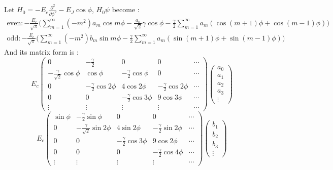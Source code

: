 \documentclass{article}
\begin{document}
Let $H_0 = -E_c \frac{\partial^2}{\partial \phi^2} - E_J \cos\phi$, $H_0 \psi$ become :
\begin{align}
    \text{even} : -\frac{E_c}{\sqrt{\pi}}\bigg(\sum^\infty_{m=1} (-m^2)a_m\cos m \phi - \frac{a_0}{\sqrt{2}}\gamma\cos\phi - \frac{\gamma}{2}\sum^\infty_{m=1}a_m(\cos(m+1)\phi + \cos(m-1)\phi)\bigg) \\
    \text{odd} : -\frac{E_c}{\sqrt{\pi}}\bigg(\sum^\infty_{m=1} (-m^2)b_m\sin m \phi - \frac{\gamma}{2}\sum^\infty_{m=1}a_m(\sin(m+1)\phi + \sin(m-1)\phi)\bigg)
\end{align}
And its matrix form is :
\begin{equation}
    E_c
    \begin{pmatrix}
      0 & -\frac{\gamma}{2} & 0 &  0 &\cdots \\
      -\frac{\gamma}{\sqrt{2}}\cos \phi & \cos \phi & -\frac{\gamma}{2} \cos \phi & 0 & \cdots \\
      0 & -\frac{\gamma}{2} \cos 2\phi & 4\cos 2\phi & -\frac{\gamma}{2} \cos 2\phi& \cdots \\
      0 & 0 & -\frac{\gamma}{2} \cos 3\phi & 9\cos 3\phi & \cdots \\
      \vdots & \vdots & \vdots & \vdots & \cdots
    \end{pmatrix}
    \begin{pmatrix}
        a_0 \\ a_1 \\ a_2 \\ a_3 \\ \vdots
    \end{pmatrix}
\end{equation}
\begin{equation}
    E_c
    \begin{pmatrix}
      \sin \phi & -\frac{\gamma}{2} \sin\phi & 0 & 0 & \cdots \\
      0 & -\frac{\gamma}{\sqrt{2}}\sin 2\phi & 4\sin 2\phi & -\frac{\gamma}{2} \sin 2\phi & \cdots \\
      0 & 0 & -\frac{\gamma}{2} \cos 3\phi & 9\cos 2\phi & \cdots \\
      0 & 0 & 0 & -\frac{\gamma}{2} \cos 4\phi & \cdots \\
      \vdots & \vdots & \vdots & \vdots & \cdots
    \end{pmatrix}
    \begin{pmatrix}
        b_1 \\ b_2 \\ b_3 \\ \vdots
    \end{pmatrix}
\end{equation}
\end{document}
